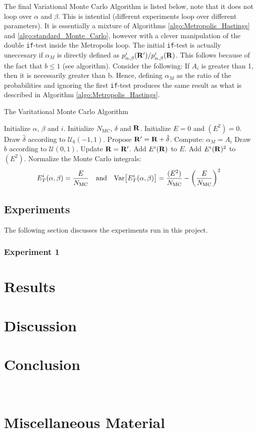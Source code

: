 \documentclass[nofootinbib,reprint,english]{revtex4-1}
\begin{document}
The final Variational Monte Carlo Algorithm is listed below, note that it does not loop over \(\alpha\) and \(\beta\). This is intential (different experiments loop over different parameters). It is essentially a mixture of Algorithms \ref{algo:Metropolis_Hastings} and \ref{algo:standard_Monte_Carlo}, however with a clever manipulation of the double \texttt{if}-test inside the Metropolis loop. The initial \texttt{if}-test is actually uneccesary if \(\alpha_M\) is directly defined as \(p_{\alpha,\beta}^i(\vb{R}')/p_{\alpha,\beta}^i(\vb{R})\). This follows because of the fact that \(b\leq1\) (see algorithm). Consider the following: If \(A_i\) is greater than 1, then it is necessarily greater than b. Hence, defining \(\alpha_M\) as the ratio of the probabilities and ignoring the first \texttt{if}-test produces the same result as what is described in Algorithm \ref{algo:Metropolis_Hastings}.

\begin{algorithm}[H]
\caption{The Varitational Monte Carlo Algorithm}\label{algo:Metropolis_Hastings}
\begin{algorithmic}[1]
\State Initialize \(\alpha\), \(\beta\) and \(i\).
\State Initialize \(N_\text{MC}\), \(\delta\) and \(\vb{R}\).
\State Initialize \(E=0\) and \((E^2)=0\).
	\State Draw \(\hat{\delta}\) according to \(\mathcal{U}_6(-1,1)\).
	\State Propose \(\vb{R}'=\vb{R}+\hat{\delta}\).
	\State Compute: \(\alpha_M=A_i\)
	\State Draw \(b\) according to \(\mathcal{U}(0,1)\).
		\State Update \(\vb{R}=\vb{R}'\).
	\EndIf
	\State Add \(E^i(\vb{R})\) to \(E\).
	\State Add \(E^i(\vb{R})^2\) to \((E^2)\).
\EndFor
\State Normalize the Monte Carlo integrals:
\[E_T^i(\alpha,\beta)=\frac{E}{N_\text{MC}}\qand \text{Var}\big[E_T^i(\alpha,\beta)\big]=\frac{(E^2)}{N_\text{MC}}-\bigg(\frac{E}{N_\text{MC}}\bigg)^2\]
\end{algorithmic}
\end{algorithm}

\subsection{Experiments}
The following section discusses the experiments run in this project.
\subsubsection{Experiment 1}






\section{Results}


\section{Discussion}

\section{Conclusion}

%
%


~
\clearpage
\appendix

\onecolumngrid
\section{Miscellaneous Material}\label{app:misc_material}
\end{document}
